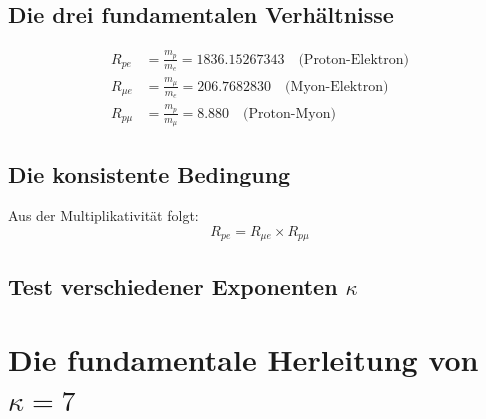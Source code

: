 	\subsection{Die drei fundamentalen Verhältnisse}
	
	\begin{align}
		R_{pe} &= \frac{m_p}{m_e} = 1836.15267343 \quad \text{(Proton-Elektron)} \\
		R_{\mu e} &= \frac{m_{\mu}}{m_e} = 206.7682830 \quad \text{(Myon-Elektron)} \\
		R_{p\mu} &= \frac{m_p}{m_{\mu}} = 8.880 \quad \text{(Proton-Myon)}
	\end{align}
	
	\subsection{Die konsistente Bedingung}
	
	Aus der Multiplikativität folgt:
	\begin{equation}
		R_{pe} = R_{\mu e} \times R_{p\mu}
	\end{equation}
	
	\subsection{Test verschiedener Exponenten $\kappa$}
	
	\begin{table}[htbp]
		\centering
		\caption{$\kappa = 7$ ist die einzige konsistente Lösung}
	\end{table}
	
	\section{Die fundamentale Herleitung von $\kappa = 7$}
	
